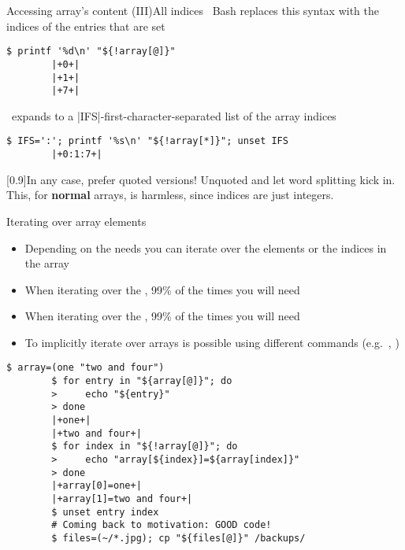\begin{frame}[fragile]{Accessing array's content (III)}{All indices}
    \vspace{-2mm}\centering
    \, Bash replaces this syntax with the indices of the entries that are set
    \smallskip
    \begin{lstlisting}[style=MyBash, numbers=none]
        $ printf '%d\n' "${!array[@]}"
        |+0+|
        |+1+|
        |+7+|
    \end{lstlisting}
    \medskip
    \, expands to a \bash|IFS|-first-character-separated list of the array indices
    \smallskip
    \begin{lstlisting}[style=MyBash, numbers=none]
        $ IFS=':'; printf '%s\n' "${!array[*]}"; unset IFS
        |+0:1:7+|
    \end{lstlisting}
    \medskip
    \begin{varblock}{}[0.9\textwidth]{In any case, prefer quoted versions!}
        Unquoted  and  let \alert{word splitting} kick in.
        This, for \textbf{normal} arrays, is harmless, since indices are just integers.
    \end{varblock}    
\end{frame}
\begin{frame}[fragile]{Iterating over array elements}
    \vspace{-3mm}
    \begin{itemize}
        \item Depending on the needs you can iterate over the elements or the indices in the array
        \item When iterating over the \textbf{}, 99\% of the times you will need \,
        \item When iterating over the \textbf{}, 99\% of the times you will need \,
        \item To implicitly iterate over arrays is possible using different commands (e.g.\ , )
    \end{itemize}
    \begin{lstlisting}[style=MyBash]
        $ array=(one "two and four")
        $ for entry in "${array[@]}"; do
        >     echo "${entry}"
        > done
        |+one+|
        |+two and four+|
        $ for index in "${!array[@]}"; do
        >     echo "array[${index}]=${array[index]}"
        > done
        |+array[0]=one+|
        |+array[1]=two and four+|
        $ unset entry index
        # Coming back to motivation: GOOD code!
        $ files=(~/*.jpg); cp "${files[@]}" /backups/
    \end{lstlisting}
\end{frame}
